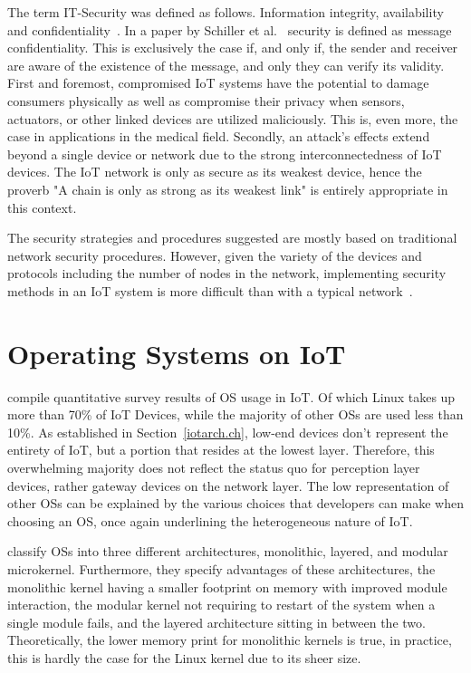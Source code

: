 The term IT-Security was defined as follows. Information integrity, availability and confidentiality~\cite{voydock1983security}. In a paper by Schiller et al.~\cite{schiller} security is defined as message confidentiality. This is exclusively the case if, and only if, the sender and receiver are aware of the existence of the message, and only they can verify its validity. First and foremost, compromised IoT systems have the potential to damage consumers physically as well as compromise their privacy when sensors, actuators, or other linked devices are utilized maliciously. This is, even more, the case in applications in the medical field. Secondly, an attack's effects extend beyond a single device or network due to the strong interconnectedness of IoT devices. The IoT network is only as secure as its weakest device, hence the proverb "A chain is only as strong as its weakest link" is entirely appropriate in this context.

The security strategies and procedures suggested are mostly based on traditional network security procedures. However, given the variety of the devices and protocols including the number of nodes in the network, implementing security methods in an IoT system is more difficult than with a typical network~\cite{hassan2019current}.

\section{Operating Systems on IoT} \label{iotos.ch}

\cite{sabri2017comparison} compile quantitative survey results of OS usage in IoT. Of which Linux takes up more than 70\% of IoT Devices, while the majority of other OSs are used less than 10\%. As established in Section~\ref{iotarch.ch}, low-end devices don't represent the entirety of IoT, but a portion that resides at the lowest layer. Therefore, this overwhelming majority does not reflect the status quo for perception layer devices, rather gateway devices on the network layer. The low representation of other OSs can be explained by the various choices that developers can make when choosing an OS, once again underlining the heterogeneous nature of IoT.

\cite{gaur2015operating} classify OSs into three different architectures, monolithic, layered, and modular microkernel. Furthermore, they specify advantages of these architectures, the monolithic kernel having a smaller footprint on memory with improved module interaction, the modular kernel not requiring to restart of the system when a single module fails, and the layered architecture sitting in between the two. Theoretically, the lower memory print for monolithic kernels is true, in practice, this is hardly the case for the Linux kernel due to its sheer size.

